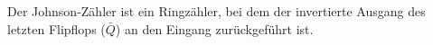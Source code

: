 Der Johnson-Zähler ist ein Ringzähler, bei dem der invertierte Ausgang des
letzten Flipflops ($\bar{Q}$) an den Eingang zurückgeführt ist.